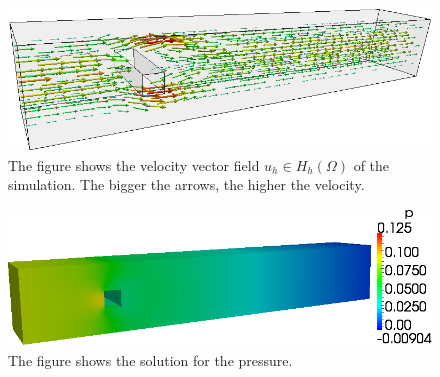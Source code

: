 \documentclass[a4paper, 11pt, twoside]{article}
\begin{document}
\begin{figure}[h!]
	\centering
		\includegraphics[width=1.1\textwidth]{fig/channel_benchmark_trans.png}
\caption{The figure shows the velocity vector field $u_h \in H_h(\Omega)$ of the simulation. The bigger the arrows, the higher the velocity.}
\label{sol_3D}
\end{figure}

\begin{figure}[h!]
	\centering
		\includegraphics[width=1.1\textwidth]{fig/FlowtutDrucktrans.png}
\caption{The figure shows the solution for the pressure.}
\label{pressure_3D}
\end{figure}

\newpage
\appendix



\printindex
\end{document}

